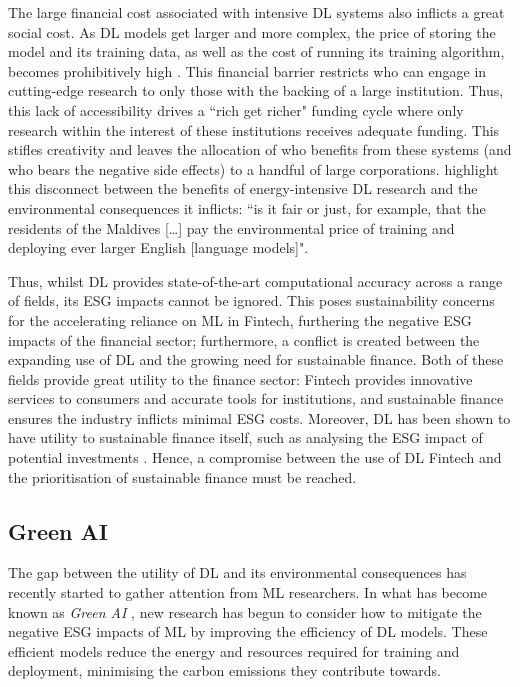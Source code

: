 \documentclass[a4paper, 11pt]{report}
\begin{document}
   The large financial cost associated with intensive DL systems also inflicts a great social cost. As DL models get larger and more complex, the price of storing the model and its training data, as well as the cost of running its training algorithm, becomes prohibitively high \citep{schwartz-2019}. This financial barrier restricts who can engage in cutting-edge research to only those with the backing of a large institution. Thus, this lack of accessibility drives a ``rich get richer" funding cycle \citep{strubell-2019} where only research within the interest of these institutions receives adequate funding. This stifles creativity and leaves the allocation of who benefits from these systems (and who bears the negative side effects) to a handful of large corporations. \citet{bender-2021} highlight this disconnect between the benefits of energy-intensive DL research and the environmental consequences it inflicts: ``is it fair or just, for example, that the residents of the Maldives [\ldots] pay the environmental price of training and deploying ever larger English [language models]".

    Thus, whilst DL provides state-of-the-art computational accuracy across a range of fields, its ESG impacts cannot be ignored. This poses sustainability concerns for the accelerating reliance on ML in Fintech, furthering the negative ESG impacts of the financial sector; furthermore, a conflict is created between the expanding use of DL and the growing need for sustainable finance. Both of these fields provide great utility to the finance sector: Fintech provides innovative services to consumers and accurate tools for institutions, and sustainable finance ensures the industry inflicts minimal ESG costs. Moreover, DL has been shown to have utility to sustainable finance itself, such as analysing the ESG impact of potential investments \citep{mehra-2022}. Hence, a compromise between the use of DL Fintech and the prioritisation of sustainable finance must be reached.


    \subsection{Green AI}

    The gap between the utility of DL and its environmental consequences has recently started to gather attention from ML researchers. In what has become known as \emph{Green AI} \citep{schwartz-2019}, new research has begun to consider how to mitigate the negative ESG impacts of ML by improving the efficiency of DL models. These efficient models reduce the energy and resources required for training and deployment, minimising the carbon emissions they contribute towards. 
\end{document}
